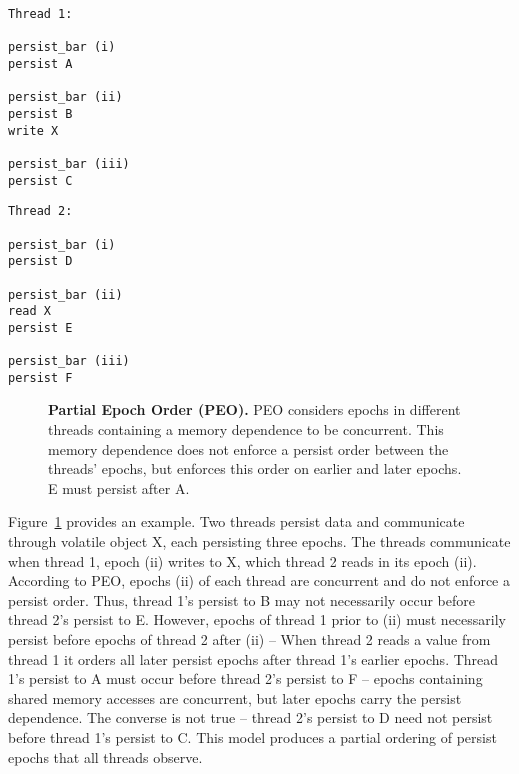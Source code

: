 {
\singlespacing
\newsavebox{\PEOThreadOne}
\begin{lrbox}{\PEOThreadOne}
  \begin{lstlisting}
Thread 1:

persist_bar (i)
persist A

persist_bar (ii)
persist B
write X

persist_bar (iii)
persist C
  \end{lstlisting}
\end{lrbox}

\newsavebox{\PEOThreadTwo}
\begin{lrbox}{\PEOThreadTwo}
  \begin{lstlisting}
Thread 2:

persist_bar (i)
persist D

persist_bar (ii)
read X
persist E

persist_bar (iii)
persist F
  \end{lstlisting}
\end{lrbox}

\begin{figure}[]
\centering
\subfigure{ \usebox{\PEOThreadOne} }
\hspace{1 in}
\subfigure{ \usebox{\PEOThreadTwo} }
\caption{\textbf{Partial Epoch Order (PEO).} PEO considers epochs in different threads containing a memory dependence to be concurrent.  This memory dependence does not enforce a persist order between the threads' epochs, but enforces this order on earlier and later epochs.  E must persist after A.}
\label{fig:PEO}
\end{figure}
}

Figure~\ref{fig:PEO} provides an example.
Two threads persist data and communicate through volatile object X, each persisting three epochs.
The threads communicate when thread 1, epoch (ii) writes to X, which thread 2 reads in its epoch (ii).
According to PEO, epochs (ii) of each thread are concurrent and do not enforce a persist order.
Thus, thread 1's persist to B may not necessarily occur before thread 2's persist to E.
However, epochs of thread 1 prior to (ii) must necessarily persist before epochs of thread 2 after (ii) -- When thread 2 reads a value from thread 1 it orders all later persist epochs after thread 1's earlier epochs.
Thread 1's persist to A must occur before thread 2's persist to F -- epochs containing shared memory accesses are concurrent, but later epochs carry the persist dependence.
The converse is not true -- thread 2's persist to D need not persist before thread 1's persist to C.
This model produces a partial ordering of persist epochs that all threads observe.

